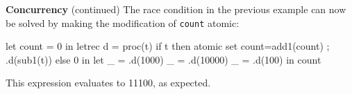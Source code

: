 \begin{minipage}[t]{\sw}
\slidenumber
\LARGE
{\bf Concurrency} (continued)\exx
The race condition in the previous example can now be solved
by making the modification of \verb'count' atomic:
\Large
\begin{qv}
let
  count = 0
in 
  letrec
    d = proc(t)
      if t
      then {atomic set count=add1(count) ; .d(sub1(t))}
      else 0
  in
    let
      _ = .d(1000)
      _ = .d(10000)
      _ = .d(100)
    in
      count
\end{qv}
\LARGE
This expression evaluates to 11100, as expected.
\end{minipage}
